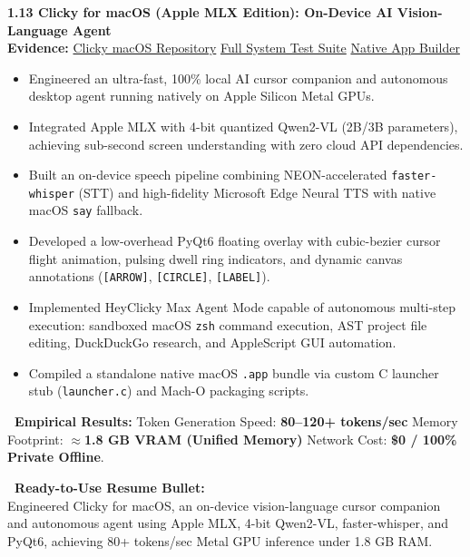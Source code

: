 \documentclass[10pt,a4paper]{article}
\newcommand{\statuscompleted}{\tcbox[on line, colback=completedbg, colframe=completed!50!white, size=small, arc=2pt, boxrule=0.5pt]{\scriptsize\bfseries\color{completed}\faIcon{check-circle}\ COMPLETED / SUBSTANTIAL}}
\begin{document}
\begin{projectcard}
  \textbf{\large 1.13 Clicky for macOS (Apple MLX Edition): On-Device AI Vision-Language Agent} \hfill \statuscompleted\\[2pt]
  {\footnotesize\color{textmuted}\textbf{Evidence:} \underline{Clicky macOS Repository} \quad\textbar\quad \underline{Full System Test Suite} \quad\textbar\quad \underline{Native App Builder}}
  \begin{itemize}[leftmargin=14pt, itemsep=1.5pt, topsep=2pt]
    \item Engineered an ultra-fast, 100\% local AI cursor companion and autonomous desktop agent running natively on Apple Silicon Metal GPUs.
    \item Integrated Apple MLX with 4-bit quantized Qwen2-VL (2B/3B parameters), achieving sub-second screen understanding with zero cloud API dependencies.
    \item Built an on-device speech pipeline combining NEON-accelerated \texttt{faster-whisper} (STT) and high-fidelity Microsoft Edge Neural TTS with native macOS \texttt{say} fallback.
    \item Developed a low-overhead PyQt6 floating overlay with cubic-bezier cursor flight animation, pulsing dwell ring indicators, and dynamic canvas annotations (\texttt{[ARROW]}, \texttt{[CIRCLE]}, \texttt{[LABEL]}).
    \item Implemented HeyClicky Max Agent Mode capable of autonomous multi-step execution: sandboxed macOS \texttt{zsh} command execution, AST project file editing, DuckDuckGo research, and AppleScript GUI automation.
    \item Compiled a standalone native macOS \texttt{.app} bundle via custom C launcher stub (\texttt{launcher.c}) and Mach-O packaging scripts.
  \end{itemize}
  \begin{metricsbox}
    \textbf{\ Empirical Results:} Token Generation Speed: \textbf{80--120+ tokens/sec} \quad\textbar\quad Memory Footprint: \textbf{$\approx$1.8 GB VRAM (Unified Memory)} \quad\textbar\quad Network Cost: \textbf{\$0 / 100\% Private Offline}.
  \end{metricsbox}
  \begin{resumebox}
    \textbf{\color{accent}\ Ready-to-Use Resume Bullet:}\\
    Engineered Clicky for macOS, an on-device vision-language cursor companion and autonomous agent using Apple MLX, 4-bit Qwen2-VL, faster-whisper, and PyQt6, achieving 80+ tokens/sec Metal GPU inference under 1.8 GB RAM.
  \end{resumebox}
\end{projectcard}
\end{document}
